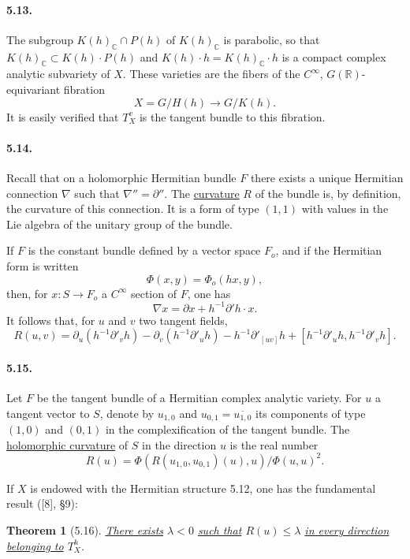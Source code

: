\documentclass[10pt,leqno]{article}
\newcommand{\C}{\mathbb C}
\newcommand{\R}{\mathbb R}
\theoremstyle{deligne}
\newtheorem*{theorem}{Theorem}
\renewcommand{\underline}[1]{\uline{#1}}
\begin{document}
\paragraph{5.13.}
The subgroup $K(h)_\C\cap P(h)$ of $K(h)_\C$ is parabolic, so that $K(h)_\C\subset K(h)\cdot P(h)$ and $K(h)\cdot h=K(h)_\C\cdot h$ is a compact complex analytic subvariety of $X$. These varieties are the fibers of the $C^\infty$, $G(\R)$-equivariant fibration
\[
  X=G/H(h)\longrightarrow G/K(h).
\]
It is easily verified that $T_X^v$ is the tangent bundle to this fibration.

\paragraph{5.14.}
Recall that on a holomorphic Hermitian bundle $F$ there exists a unique Hermitian connection $\nabla$ such that $\nabla''=\partial''$. The \underline{curvature} $R$ of the bundle is, by definition, the curvature of this connection. It is a form of type $(1,1)$ with values in the Lie algebra of the unitary group of the bundle.

If $F$ is the constant bundle defined by a vector space $F_o$, and if the Hermitian form is written
\[
\tag{5.14.1}
  \Phi(x,y)=\Phi_o(hx,y),
\]
then, for $x:S\to F_o$ a $C^\infty$ section of $F$, one has
\[
\tag{5.14.2}
  \nabla x=\partial x+h^{-1}\partial' h\cdot x.
\]
It follows that, for $u$ and $v$ two tangent fields,
\[
\tag{5.14.3}
  R(u,v)=
  \partial_u(h^{-1}\partial'_v h)
  -\partial_v(h^{-1}\partial'_u h)
  -h^{-1}\partial'_{[uv]}h
  +[h^{-1}\partial'_u h,h^{-1}\partial'_v h].
\]

\paragraph{5.15.}
Let $F$ be the tangent bundle of a Hermitian complex analytic variety. For $u$ a tangent vector to $S$, denote by $u_{1,0}$ and $u_{0,1}=\overline{u_{1,0}}$ its components of type $(1,0)$ and $(0,1)$ in the complexification of the tangent bundle. The \underline{holomorphic curvature} of $S$ in the direction $u$ is the real number
\[
\tag{5.15.1}
  R(u)=
  \Phi(R(u_{1,0},u_{0,1})(u),u)/\Phi(u,u)^2.
\]

If $X$ is endowed with the Hermitian structure 5.12, one has the fundamental result ([8], §9):

\begin{theorem}[5.16]
\underline{There exists} $\lambda<0$ \underline{such that} $R(u)\le\lambda$ \underline{in every direction belonging to} $T_X^h$.
\end{theorem}
\end{document}
